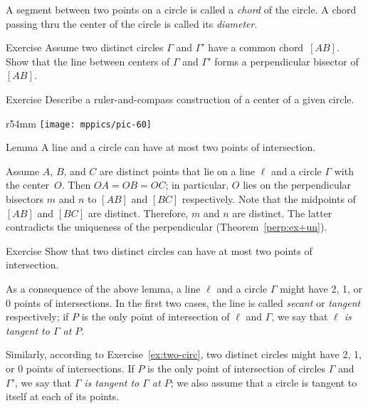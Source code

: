 A segment between two points on a circle is called a \emph{chord} of the circle.
A chord passing thru the center of the circle is called its \emph{diameter}.

\begin{thm}{Exercise}\label{ex:chord-perp}
Assume two distinct circles $\Gamma$ and $\Gamma'$ have a common chord~$[A B]$.
Show that the line between centers of $\Gamma$ and $\Gamma'$ forms a perpendicular bisector of~$[A B]$.
\end{thm}

\begin{thm}{Exercise}\label{ex:center}
Describe a ruler-and-compass construction of a center
of a given circle.
\end{thm}

{

\begin{wrapfigure}[4]{r}{54mm}
\vskip-8mm
\centering
\texttt{[image: mppics/pic-60]}
\end{wrapfigure}

\begin{thm}[\abs]{Lemma}\label{lem:line-circle}
A line and a circle can have at most two points of intersection.
\end{thm}


 Assume $A$, $B$, and $C$ are distinct points that lie on a line $\ell$ and a circle $\Gamma$ with the center~$O$.
Then $OA=OB=OC$; in particular, $O$ lies on the perpendicular bisectors 
$m$ and $n$ to $[A B]$ and $[B C]$ respectively.
Note that the midpoints of $[AB]$ and $[BC]$ are distinct.
Therefore, $m$ and $n$ are distinct.
The latter contradicts the uniqueness of the perpendicular (Theorem~\ref{perp:ex+un}).
\qeds

}

\begin{thm}{Exercise}\label{ex:two-circ}
Show that two distinct circles can have at most two points of intersection.
\end{thm}

As a consequence of the above lemma, 
a line $\ell$ and a circle $\Gamma$ might have 2, 1, or 0 points of intersections.
In the first two cases, the line is called \emph{secant} or \emph{tangent} respectively;
if $P$ is the only point of intersection of $\ell$ and $\Gamma$,
we say that \textit{$\ell$ is tangent to $\Gamma$ at $P$}. 

Similarly, according to Exercise~\ref{ex:two-circ},
two distinct circles might have 2, 1, or 0 points of intersections.
If $P$ is the only point of intersection of circles $\Gamma$ and $\Gamma'$,
we say that \emph{$\Gamma$ is tangent to $\Gamma$ at $P$}; we also assume that a circle is tangent to itself at each of its points.

